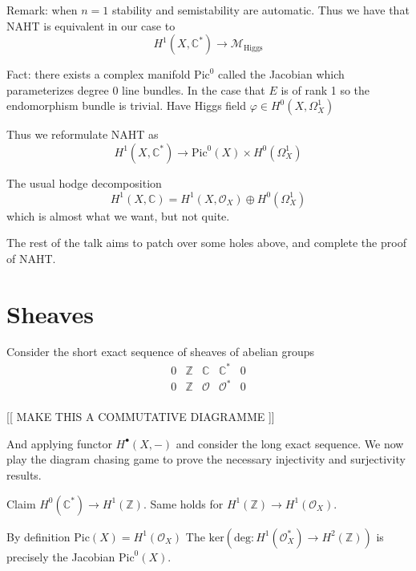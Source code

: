 Remark: when $n=1$ stability and semistability are automatic. 
Thus we have that NAHT is equivalent in our case to 
\begin{equation}
    H^1(X, \mathbb{C} ^*) \rightarrow \mathcal{M}_{\mathrm{Higgs}}
\end{equation}

Fact: there exists a complex manifold $\mathrm{Pic} ^0 $ called the Jacobian 
which parameterizes degree 0 line bundles.
In the case that $E$ is of rank 1 so the endomorphism bundle is trivial. 
Have Higgs field $\varphi \in H^0 ( X , \Omega_X ^1 ) $ 

Thus we reformulate NAHT as 
\begin{equation}
    H^1(X, \mathbb{C} ^*) \rightarrow \mathrm{Pic}^0 (X) \times H^0 (\Omega_X ^1 ) 
\end{equation}

The usual hodge decomposition 
\begin{equation}
    H^1 ( X, \mathbb{C} ) = H^1 ( X, \mathcal{O} _X ) \oplus H^0 ( \Omega_X ^1 ) 
\end{equation}
which is almost what we want, but not quite. 

The rest of the talk aims to patch over some holes above, 
and complete the proof of NAHT.

\section{Sheaves} %

Consider the short exact sequence of sheaves of abelian groups 
\begin{align}
    0 & \mathbb{Z}  & \mathbb{C}  & \mathbb{C} ^* & 0 \\
    0 & \mathbb{Z}  & \mathcal{O}  & \mathcal{O}^* & 0 \\
\end{align}

[[ MAKE THIS A COMMUTATIVE DIAGRAMME ]] 

And applying functor $H^ \bullet (X, - ) $ and consider the long exact sequence. 
We now play the diagram chasing game to prove the necessary injectivity and surjectivity results. 

Claim $ H^0 ( \mathbb{C} ^* ) \rightarrow  H^1 ( \mathbb{Z} ) $. 
Same holds for $ H^1 ( \mathbb{Z} ) \rightarrow  H^1( \mathcal{O} _X ) $.

By definition $ \mathrm{Pic} (X) = H^1 ( \mathcal{O} _X ) $
The $\mathrm{ker}( \mathrm{deg}: H^1 ( \mathcal{O}_X ^* ) \rightarrow H^2(\mathbb{Z} ) )$ is precisely the Jacobian $\mathrm{Pic}^0 (X)$.

